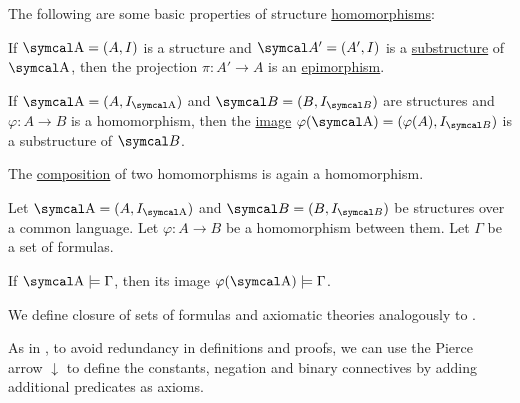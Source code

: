 \begin{proposition}\label{thm:first_order_homomorphism_properties}
  The following are some basic properties of structure \hyperref[def:first_order_homomorphism]{homomorphisms}:
  \begin{defenum}
     If \( \CA = (A, I) \) is a structure and \( \Cal{A'} = (A', I) \) is a \hyperref[def:first_order_substructure]{substructure} of \( \CA \), then the projection \( \pi: A' \to A \) is an \hyperref[def:first_order_homomorphism/projection]{epimorphism}.

     If \( \CA = (A, I_{\CA}) \) and \( \Cal{B} = (B, I_{\Cal{B}}) \) are structures and \( \varphi: A \to B \) is a homomorphism, then the \hyperref[def:function]{image} \( \varphi(\CA) = (\varphi(A), I_{\Cal{B}}) \) is a substructure of \( \Cal{B} \).

     The \hyperref[def:function/composition]{composition} of two homomorphisms is again a homomorphism.
  \end{defenum}
\end{proposition}

\begin{proposition}\label{thm:first_order_homomorphism_preserves_models}\cite[definition 23.8]{OpenLogic20201202}
  Let \( \CA = (A, I_{\CA}) \) and \( \Cal{B} = (B, I_{\Cal{B}}) \) be structures over a common language. Let \( \varphi: A \to B \) be a homomorphism between them. Let \( \Gamma \) be a set of formulas.

  If \( \CA \models \Gamma \), then its image \( \varphi(\CA) \models \Gamma \).
\end{proposition}

\begin{definition}\label{def:first_order_theory}
  We define closure of sets of formulas and axiomatic theories analogously to .
\end{definition}

\begin{remark}\label{remark:minimal_first_order_language}
  As in , to avoid redundancy in definitions and proofs, we can use the Pierce arrow \( \downarrow \) to define the constants, negation and binary connectives by adding additional predicates as axioms.
\end{remark}

